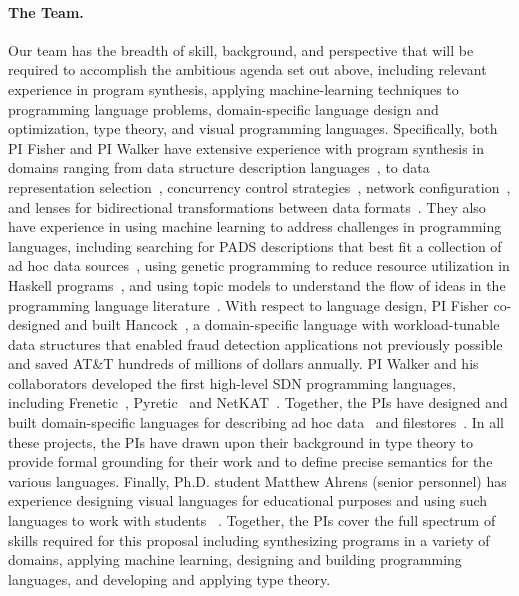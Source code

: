 
\paragraph{The Team.}  

Our team has the breadth of skill, background, and perspective that
will be required to accomplish the ambitious agenda set out above, including
relevant experience in program synthesis, applying machine-learning
techniques to programming language problems, domain-specific language
design and optimization, type theory, and visual programming
languages.
Specifically, both PI Fisher and PI Walker have extensive experience
with program synthesis in domains ranging from data structure
description languages~\cite{zhu+:learnpads2}, to data representation
selection~\cite{data-rep-synth},
concurrency control strategies~\cite{conc-data-rep-synth}, 
network configuration~\cite{beckett+:propane,beckett+:config-synt2}, and
lenses for bidirectional transformations between data
formats~\cite{miltner+:synthesizing-bijective-lenses}.
They also have experience in using machine learning to address
challenges in programming languages, including searching for PADS
descriptions that best fit a collection of ad hoc data
sources~\cite{zhu+:learnpads2}, using genetic programming to reduce
resource utilization in Haskell programs~\cite{autobahn}, and using
topic models to understand the flow of ideas in the programming
language literature~\cite{TMPL-snapl}.
With respect to language design, PI Fisher co-designed and built
Hancock~\cite{hancock}, a domain-specific language with
workload-tunable data structures that enabled fraud detection
applications not previously possible and saved AT\&T hundreds of
millions of dollars annually.
PI Walker and his collaborators developed the first high-level
SDN programming languages, including Frenetic~\cite{frenetic}, Pyretic~\cite{pyretic} and
NetKAT~\cite{netkat}. 
Together, the PIs have designed and built domain-specific languages for
describing ad hoc data~\cite{pldi05:fisher+,mandelbaum:pads-ml} and
filestores~\cite{fisher+:forest}.
In all these projects, the PIs have drawn upon their background in
type theory to provide formal grounding for their work and to define
precise semantics for the various languages.
Finally, Ph.D. student Matthew Ahrens (senior personnel) has experience designing visual
languages for educational purposes and using such languages to work
with students ~\cite{Blocks}.
Together, the PIs cover the full spectrum of skills required for this
proposal including 
synthesizing programs in a variety of domains,
applying machine learning,
designing and building programming languages,  and
developing and applying type theory.


